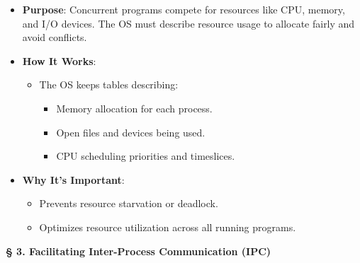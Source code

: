 \documentclass[a4paper]{book}
\newcommand{\sfbf}[1]{{\normalsize\textsf{\textbf{§ #1}}}}
\begin{document}
\begin{itemize}
\item 
\textbf{Purpose}: Concurrent programs compete for resources like CPU, memory, and I/O devices. The OS must describe resource usage to allocate fairly and avoid conflicts.

\item 
\textbf{How It Works}:
\begin{itemize}
\item 
The OS keeps tables describing:
\begin{itemize}
\item 
Memory allocation for each process.

\item 
Open files and devices being used.

\item 
CPU scheduling priorities and timeslices.

\end{itemize}

\end{itemize}

\item 
\textbf{Why It's Important}:
\begin{itemize}
\item 
Prevents resource starvation or deadlock.

\item 
Optimizes resource utilization across all running programs.

\end{itemize}

\end{itemize}
\hrulefill

\sfbf{3. Facilitating Inter-Process Communication (IPC)}
\end{document}
